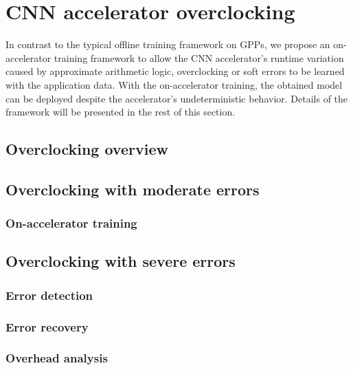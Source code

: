 \section{CNN accelerator overclocking} \label{sec:framework}
In contrast to the typical offline training framework on GPPs, we propose an 
on-accelerator training framework to allow the CNN accelerator's runtime variation 
caused by approximate arithmetic logic, overclocking or soft errors 
to be learned with the application data. With the on-accelerator training,
the obtained model can be deployed despite the accelerator's 
undeterministic behavior. Details of the framework will be presented in 
the rest of this section.

\subsection{Overclocking overview}
\subsection{Overclocking with moderate errors}
\subsubsection{On-accelerator training}
\subsection{Overclocking with severe errors}
\subsubsection{Error detection}
\subsubsection{Error recovery}
\subsubsection{Overhead analysis}
